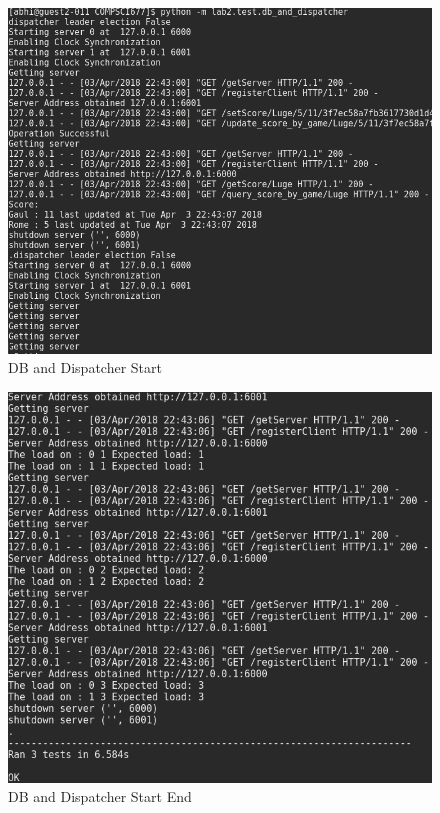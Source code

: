 \documentclass{article}
\begin{document}
\begin{figure}[H]
        \centering
        \includegraphics[width=\textwidth]{outputs/db_and_dispatcher_test_start.png}
        \caption{DB and Dispatcher Start\label{fig:clong_synchronization}}
\end{figure}

\begin{figure}[H]
        \centering
        \includegraphics[width=\textwidth]{outputs/db_and_dispatcher_test_end.png}
        \caption{DB and Dispatcher Start End \label{fig:clong_synchronization}}
\end{figure}
\end{document}
